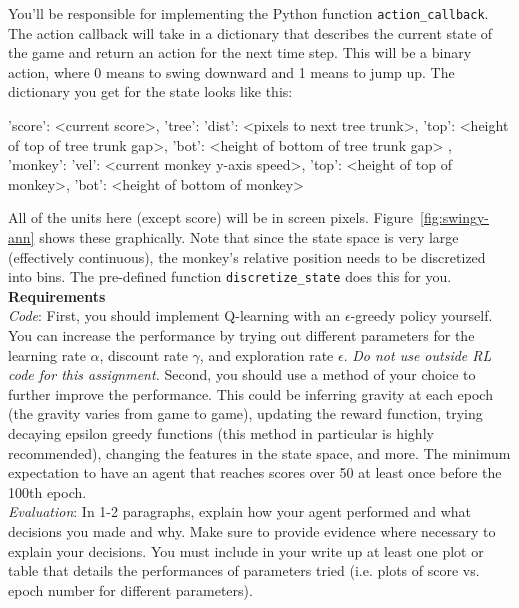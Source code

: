 \documentclass[submit]{harvardml}
\begin{document}
\begin{problem}
    You'll be responsible for implementing the Python function  \verb|action_callback|. The action callback will take in a dictionary that describes the current state of the game and return an action for the next time step. This will be a binary action, where 0 means to swing downward and 1 means to jump up. The dictionary you get for the state looks like this:
    \begin{csv}
    { 'score': <current score>,
      'tree': { 'dist': <pixels to next tree trunk>,
                'top':  <height of top of tree trunk gap>,
                'bot':  <height of bottom of tree trunk gap> },
      'monkey': { 'vel': <current monkey y-axis speed>,
                  'top': <height of top of monkey>,
                  'bot': <height of bottom of monkey> }}
    \end{csv}
    All of the units here (except score) will be in screen pixels. Figure~\ref{fig:swingy-ann} shows these graphically. Note that since the state space is very large (effectively continuous), the monkey's relative position needs to be discretized into bins. The pre-defined function \verb|discretize_state| does this for you. \\

    \noindent \textbf{Requirements}
    \\
    \noindent \textit{Code}: First, you should implement Q-learning with an
    $\epsilon$-greedy policy yourself. You can increase the performance by
    trying out different parameters for the learning rate $\alpha$,
    discount rate $\gamma$, and exploration rate $\epsilon$. \emph{Do not use outside RL code for this assignment.} Second, you should use a method of your choice to further improve the performance. This could be inferring gravity at each epoch (the gravity varies from game to game), updating the reward function, trying decaying epsilon greedy functions (this method in particular is highly recommended), changing the features in the state space, and more. The minimum expectation to have an agent that reaches scores over 50 at least once before the 100th epoch. \\
    
    \noindent \textit{Evaluation}: In 1-2 paragraphs, explain how your agent performed and what decisions you made and why. Make sure to provide evidence where necessary to explain your decisions. You must include in your write up at least one plot or table that details the performances of parameters tried (i.e. plots of score vs. epoch number for different parameters). \\
    

\end{problem}
\end{document}
